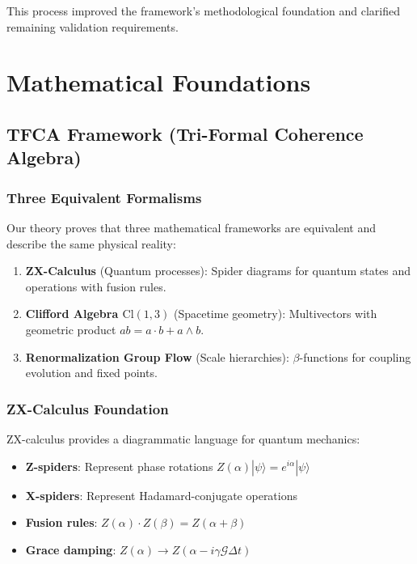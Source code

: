 \documentclass[12pt,a4paper]{article}
\begin{document}
This process improved the framework's methodological foundation and clarified remaining validation requirements.

\section{Mathematical Foundations}

\subsection{TFCA Framework (Tri-Formal Coherence Algebra)}

\subsubsection{Three Equivalent Formalisms}
Our theory proves that three mathematical frameworks are equivalent and describe the same physical reality:

\begin{enumerate}
\item \textbf{ZX-Calculus} (Quantum processes): Spider diagrams for quantum states and operations with fusion rules.

\item \textbf{Clifford Algebra $\mathrm{Cl}(1,3)$} (Spacetime geometry): Multivectors with geometric product $ab = a \cdot b + a \wedge b$.

\item \textbf{Renormalization Group Flow} (Scale hierarchies): $\beta$-functions for coupling evolution and fixed points.
\end{enumerate}

\subsubsection{ZX-Calculus Foundation}
ZX-calculus provides a diagrammatic language for quantum mechanics:

\begin{itemize}
\item \textbf{Z-spiders}: Represent phase rotations $Z(\alpha) |\psi\rangle = e^{i\alpha} |\psi\rangle$
\item \textbf{X-spiders}: Represent Hadamard-conjugate operations
\item \textbf{Fusion rules}: $Z(\alpha) \cdot Z(\beta) = Z(\alpha + \beta)$
\item \textbf{Grace damping}: $Z(\alpha) \rightarrow Z(\alpha - i\gamma \mathcal{G} \Delta t)$
\end{itemize}
\end{document}
